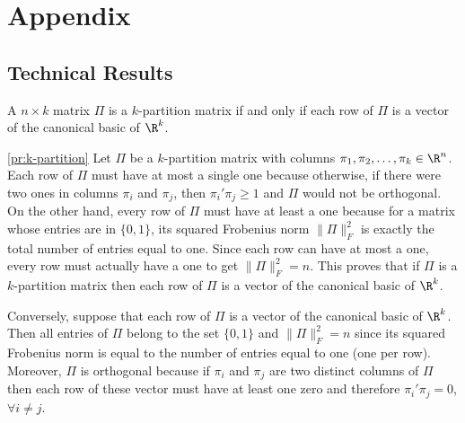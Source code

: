 \documentclass[10pt]{article}
\begin{document}
\appendix

\section{Appendix}

\subsection{Technical Results}

\begin{proposition}\label{pr:k-partition}
  A $n\times k$ matrix $\Pi$ is a $k$-partition matrix if and only if each
  row of $\Pi$ is a vector of the canonical basic of $\R^k$.\frqed
\end{proposition}

\begin{proof-proposition}{\ref{pr:k-partition}}
  Let $\Pi$ be a $k$-partition matrix with columns
  $\pi_1,\pi_2,\dots,\pi_k\in\R^n$.  Each row of $\Pi$ must have at most a
  single one because otherwise, if there were two ones in columns
  $\pi_i$ and $\pi_j$, then $\pi_i'\pi_j\geq 1$ and $\Pi$ would not be orthogonal.
  On the other hand, every row of $\Pi$ must have at least a one because
  for a matrix whose entries are in $\{0,1\}$, its squared Frobenius
  norm $\|\Pi\|_F^2$ is exactly the total number of entries equal to one.
  Since each row can have at most a one, every row must actually have
  a one to get $\|\Pi\|_F^2=n$. This proves that if $\Pi$ is a $k$-partition
  matrix then each row of $\Pi$ is a vector of the canonical basic of
  $\R^k$.

  \medskip
  
  Conversely, suppose that each row of $\Pi$ is a vector of the
  canonical basic of $\R^k$. Then all entries of $\Pi$ belong to the set
  $\{0,1\}$ and $\|\Pi\|_F^2=n$ since its squared Frobenius norm is equal to
  the number of entries equal to one (one per row). Moreover, $\Pi$ is
  orthogonal because if $\pi_i$ and $\pi_j$ are two distinct columns of
  $\Pi$ then each row of these vector must have at least one zero and
  therefore $\pi_i'\pi_j=0$, $\forall i\neq j$. \frQED
\end{proof-proposition}
\end{document}
